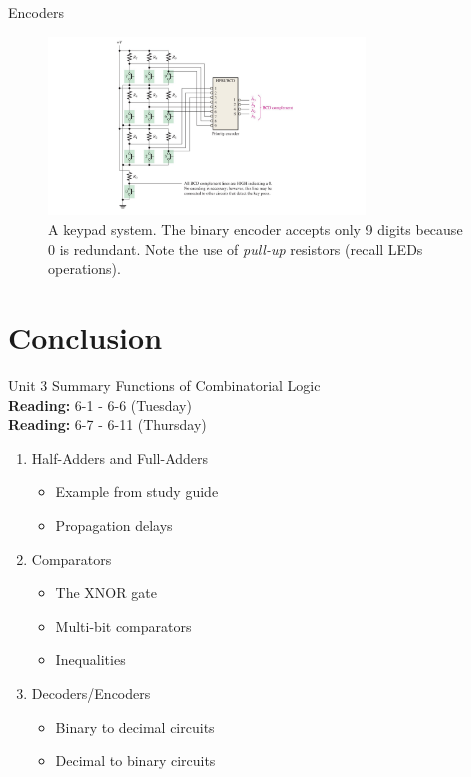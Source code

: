 \documentclass{beamer}
\begin{document}
\begin{frame}{Encoders}
\begin{figure}
\centering
\includegraphics[width=0.75\textwidth,trim=3cm 0cm 3cm 0cm,clip=true]{figures/encoder2.pdf}
\caption{\label{fig:encoder2} A keypad system.  The binary encoder accepts only 9 digits because 0 is redundant.  Note the use of \textit{pull-up} resistors (recall LEDs operations).}
\end{figure}
\end{frame}

\section{Conclusion}

\begin{frame}{Unit 3 Summary}
\alert{Functions of Combinatorial Logic} \\
\textbf{Reading:} 6-1 - 6-6 (Tuesday) \\
\textbf{Reading:} 6-7 - 6-11 (Thursday)
\begin{enumerate}
\item Half-Adders and Full-Adders
\begin{itemize}
\item Example from study guide
\item Propagation delays
\end{itemize}
\item Comparators
\begin{itemize}
\item The XNOR gate
\item Multi-bit comparators
\item Inequalities
\end{itemize}
\item Decoders/Encoders
\begin{itemize}
\item Binary to decimal circuits
\item Decimal to binary circuits
\end{itemize}
\end{enumerate}
\end{frame}
\end{document}

